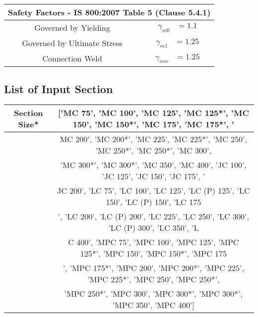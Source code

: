 \documentclass{article}%
\begin{document}
\begin{longtable}{|p{5cm}|p{2cm}|p{2cm}|p{2cm}|p{5cm}|}
\hline%
\hline%
\multicolumn{5}{|c|}{\textbf{Safety Factors {-} IS 800:2007 Table 5 (Clause 5.4.1) }}\\%
\hline%
\hline%
\multicolumn{3}{|c|}{Governed by Yielding}&\multicolumn{2}{|c|}{$\begin{aligned}\gamma_{m0}&=1.1\end{aligned}$}\\%
\hline%
\hline%
\multicolumn{3}{|c|}{Governed by Ultimate Stress}&\multicolumn{2}{|c|}{$\begin{aligned}\gamma_{m1}&=1.25\end{aligned}$}\\%
\hline%
\hline%
\multicolumn{3}{|c|}{Connection Weld}&\multicolumn{2}{|c|}{$\begin{aligned}\gamma_{mw}&=1.25\end{aligned}$}\\%
\hline%
\end{longtable}%
\subsection{List of Input Section}%
\label{subsec:ListofInputSection}%
\renewcommand{\arraystretch}{1.2}%
\begin{longtable}{|p{8cm}|p{8cm}|}%
\hline%
\multicolumn{1}{|c|}{Section Size*}&\multicolumn{1}{|c|}{{[}'MC 75', 'MC 100', 'MC 125', 'MC 125*', 'MC 150', 'MC 150*', 'MC 175', 'MC 175*', '}\\%
\hline%
\hline%
\multicolumn{1}{|c|}{ }&\multicolumn{1}{|c|}{MC 200', 'MC 200*', 'MC 225', 'MC 225*', 'MC 250', 'MC 250*', 'MC 250*', 'MC 300', }\\%
\hline%
\hline%
\multicolumn{1}{|c|}{ }&\multicolumn{1}{|c|}{'MC 300*', 'MC 300*', 'MC 350', 'MC 400', 'JC 100', 'JC 125', 'JC 150', 'JC 175', '}\\%
\hline%
\hline%
\multicolumn{1}{|c|}{ }&\multicolumn{1}{|c|}{JC 200', 'LC 75', 'LC 100', 'LC 125', 'LC (P) 125', 'LC 150', 'LC (P) 150', 'LC 175}\\%
\hline%
\hline%
\multicolumn{1}{|c|}{ }&\multicolumn{1}{|c|}{', 'LC 200', 'LC (P) 200', 'LC 225', 'LC 250', 'LC 300', 'LC (P) 300', 'LC 350', 'L}\\%
\hline%
\hline%
\multicolumn{1}{|c|}{ }&\multicolumn{1}{|c|}{C 400', 'MPC 75', 'MPC 100', 'MPC 125', 'MPC 125*', 'MPC 150', 'MPC 150*', 'MPC 175}\\%
\hline%
\hline%
\multicolumn{1}{|c|}{ }&\multicolumn{1}{|c|}{', 'MPC 175*', 'MPC 200', 'MPC 200*', 'MPC 225', 'MPC 225*', 'MPC 250', 'MPC 250*',}\\%
\hline%
\hline%
\multicolumn{1}{|c|}{ }&\multicolumn{1}{|c|}{ 'MPC 250*', 'MPC 300', 'MPC 300*', 'MPC 300*', 'MPC 350', 'MPC 400'{]}}\\%
\hline%
\end{longtable}
\end{document}
